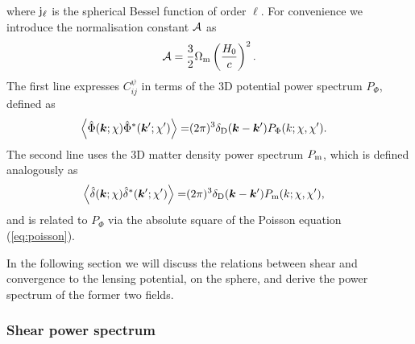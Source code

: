 \documentclass[fleqn,usenatbib]{mnras} %
\newcommand{\pref}{{\cal A}}
\renewcommand{\vec}{\bm}
\begin{document}
%
where ${\rm j}_\ell$ is the spherical Bessel function of order $\ell$. For
convenience we introduce the normalisation constant $\pref$ as
%
\begin{equation}
  \pref = \frac 3 2 \Omega_{\rm m} \left(\frac{H_0} c\right)^2.
  \label{eq:pref}
\end{equation}
%
The first line expresses $C_{ij}^\psi$ in terms of the 3D potential power spectrum $P_\Phi$, defined as
%
\begin{align}
  \left\langle \hat \Phi(\vec k; \chi) \hat \Phi^\ast(\vec k^\prime; \chi^\prime) \right\rangle
    = & (2\pi)^3 \delta_{\rm D}(\vec k - \vec k^\prime) P_\Phi(k; \chi, \chi^\prime).
  \label{eq:p_phi}
\end{align}
%
The second line uses the 3D matter density power spectrum $P_{\rm m}$, which is defined analogously as
%
\begin{align}
  \left\langle \hat \delta(\vec k; \chi) \hat \delta^\ast(\vec k^\prime; \chi^\prime) \right\rangle
    = & (2\pi)^3 \delta_{\rm D}(\vec k - \vec k^\prime) P_{\rm m}(k; \chi, \chi^\prime),
  \label{eq:p_m}
\end{align}
%
and is
related to $P_\Phi$ via the absolute square of the Poisson equation (\ref{eq:poisson}).


In the following section we will discuss the relations between shear and
convergence to the lensing potential, on the sphere, and derive the power
spectrum of the former two fields.

\subsubsection{Shear power spectrum}
\end{document}
